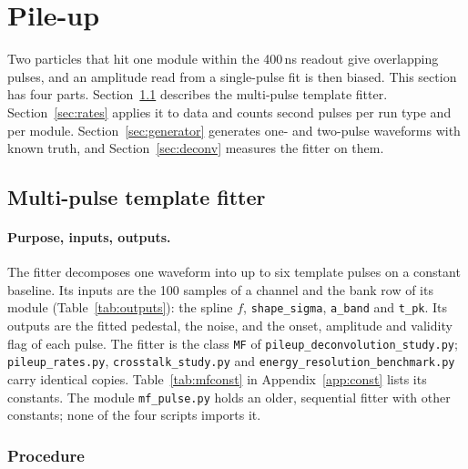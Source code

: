 \documentclass[11pt]{article}
\newcommand{\code}[1]{\texttt{#1}}
\begin{document}
\section{Pile-up}
\label{sec:pileup}

Two particles that hit one module within the 400\,ns readout give overlapping pulses, and an amplitude read from a single-pulse fit is then biased. This section has four parts. Section~\ref{sec:fitter} describes the multi-pulse template fitter. Section~\ref{sec:rates} applies it to data and counts second pulses per run type and per module. Section~\ref{sec:generator} generates one- and two-pulse waveforms with known truth, and Section~\ref{sec:deconv} measures the fitter on them.

\subsection{Multi-pulse template fitter}
\label{sec:fitter}

\paragraph{Purpose, inputs, outputs.} The fitter decomposes one waveform into up to six template pulses on a constant baseline. Its inputs are the 100 samples of a channel and the bank row of its module (Table~\ref{tab:outputs}): the spline $f$, \code{shape\_sigma}, \code{a\_band} and \code{t\_pk}. Its outputs are the fitted pedestal, the noise, and the onset, amplitude and validity flag of each pulse. The fitter is the class \code{MF} of \code{pileup\_deconvolution\_study.py}; \code{pileup\_rates.py}, \code{crosstalk\_study.py} and \code{energy\_resolution\_benchmark.py} carry identical copies. Table~\ref{tab:mfconst} in Appendix~\ref{app:const} lists its constants. The module \code{mf\_pulse.py} holds an older, sequential fitter with other constants; none of the four scripts imports it.

\subsubsection{Procedure}
\end{document}
